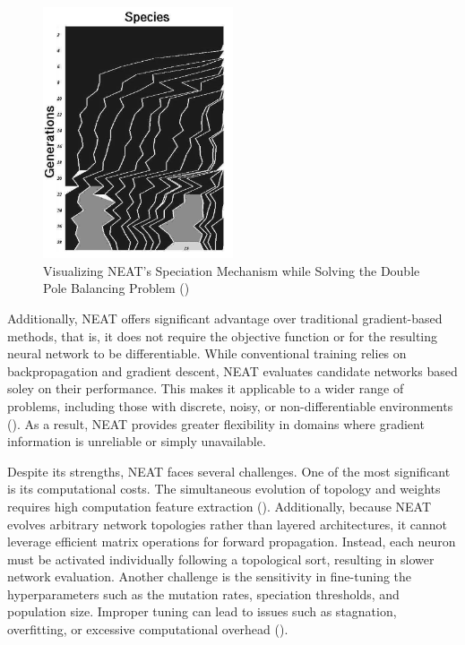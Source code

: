 \parbreak
\begin{figure}[H] %
	\centering %
	\includegraphics[width=0.50\textwidth]{Figures/chapter_ne/ne_neat_speciate_vis.png} %
	\caption{Visualizing NEAT's Speciation Mechanism while Solving the Double Pole Balancing Problem (\cite{stanley2002evolving})}
	\label{fig:neat_speciate_vis} %
\end{figure}

\parbreak\noindent Additionally, NEAT offers significant advantage over traditional gradient-based methods, that is, it does not require the objective function or for the resulting neural network to be differentiable. While conventional training relies on backpropagation and gradient descent, NEAT evaluates candidate networks based soley on their performance. This makes it applicable to a wider range of problems, including those with discrete, noisy, or non-differentiable environments (\cite{stanley2002evolving}). As a result, NEAT provides greater flexibility in domains where gradient information is unreliable or simply unavailable.

\parbreak\noindent Despite its strengths, NEAT faces several challenges. One of the most significant is its computational costs. The simultaneous evolution of topology and weights requires high computation feature extraction (\cite{peng2018neat}). Additionally, because NEAT evolves arbitrary network topologies rather than layered architectures, it cannot leverage efficient matrix operations for forward propagation. Instead, each neuron must be activated individually following a topological sort, resulting in slower network evaluation. Another challenge is the sensitivity in fine-tuning the hyperparameters such as the mutation rates, speciation thresholds, and population size. Improper tuning can lead to issues such as stagnation, overfitting, or excessive computational overhead (\cite{stanley2002evolving}).

